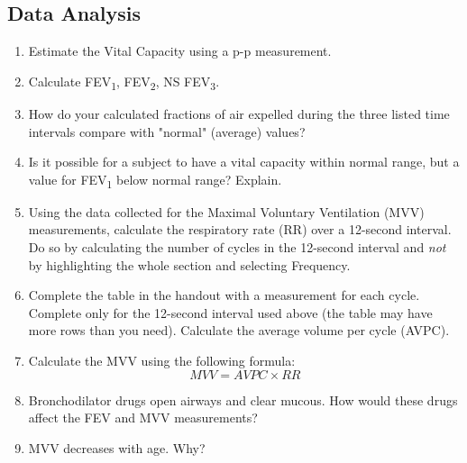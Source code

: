 \documentclass{article}
\begin{document}
\subsection*{Data Analysis}
\begin{enumerate}
	\item Estimate the Vital Capacity using a p-p measurement.
	\item Calculate FEV\textsubscript{1}, FEV\textsubscript{2}, NS FEV\textsubscript{3}.
	\item How do your calculated fractions of air expelled during the three listed time intervals compare with "normal" (average) values?
	\item Is it possible for a subject to have a vital capacity within normal range, but a value for FEV\textsubscript{1} below normal range? Explain.
	\item Using the data collected for the Maximal Voluntary Ventilation (MVV) measurements, calculate the respiratory rate (RR) over a 12-second interval. Do so by calculating the number of cycles in the 12-second interval and \textit{not} by highlighting the whole section and selecting Frequency.
	\item Complete the table in the handout with a measurement for each cycle. Complete only for the 12-second interval used above (the table may have more rows than you need). Calculate the average volume per cycle (AVPC).
	\item Calculate the MVV using the following formula:\begin{equation}
		MVV = AVPC \times RR
	\end{equation}
	
	\item Bronchodilator drugs open airways and clear mucous. How would these drugs affect the FEV and MVV measurements?
	\item MVV decreases with age. Why?
\end{enumerate}
\end{document}
